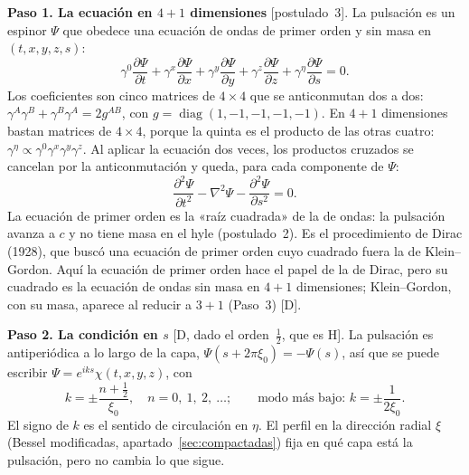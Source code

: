 \documentclass[11pt,a4paper]{article}
\newcommand{\st}[1]{\textup{[#1]}}
\begin{document}
\textbf{Paso 1. La ecuación en $4+1$ dimensiones} \st{postulado~3}. La pulsación es un espinor $\Psi$ que obedece una ecuación de ondas de primer orden y sin masa en $(t,x,y,z,s)$:
\begin{equation}
\gamma^0\frac{\partial\Psi}{\partial t}+\gamma^x\frac{\partial\Psi}{\partial x}+\gamma^y\frac{\partial\Psi}{\partial y}+\gamma^z\frac{\partial\Psi}{\partial z}+\gamma^\eta\frac{\partial\Psi}{\partial s}=0 .
\label{eq:paso1}
\end{equation}
Los coeficientes son cinco matrices de $4\times4$ que se anticonmutan dos a dos: $\gamma^A\gamma^B+\gamma^B\gamma^A=2g^{AB}$, con $g=\operatorname{diag}(1,-1,-1,-1,-1)$. En $4+1$ dimensiones bastan matrices de $4\times4$, porque la quinta es el producto de las otras cuatro: $\gamma^\eta\propto\gamma^0\gamma^x\gamma^y\gamma^z$. Al aplicar la ecuación dos veces, los productos cruzados se cancelan por la anticonmutación y queda, para cada componente de $\Psi$:
\begin{equation}
\frac{\partial^2\Psi}{\partial t^2}-\nabla^2\Psi-\frac{\partial^2\Psi}{\partial s^2}=0 .
\label{eq:ondas5}
\end{equation}
La ecuación de primer orden es la «raíz cuadrada» de la de ondas: la pulsación avanza a $c$ y no tiene masa en el hyle (postulado~2). Es el procedimiento de Dirac (1928), que buscó una ecuación de primer orden cuyo cuadrado fuera la de Klein--Gordon. Aquí la ecuación de primer orden hace el papel de la de Dirac, pero su cuadrado es la ecuación de ondas sin masa en $4+1$ dimensiones; Klein--Gordon, con su masa, aparece al reducir a $3+1$ (Paso~3) \st{D}.

\textbf{Paso 2. La condición en $s$} \st{D, dado el orden~$\tfrac12$, que es H}. La pulsación es antiperiódica a lo largo de la capa, $\Psi(s+2\pi\xi_0)=-\Psi(s)$, así que se puede escribir $\Psi=e^{iks}\chi(t,x,y,z)$, con
\begin{equation}
k=\pm\frac{n+\tfrac12}{\xi_0},\quad n=0,\ 1,\ 2,\ \dots;
\qquad\text{modo más bajo: } k=\pm\frac{1}{2\xi_0} .
\label{eq:paso2}
\end{equation}
El signo de $k$ es el sentido de circulación en $\eta$. El perfil en la dirección radial $\xi$ (Bessel modificadas, apartado~\ref{sec:compactadas}) fija en qué capa está la pulsación, pero no cambia lo que sigue.
\end{document}
